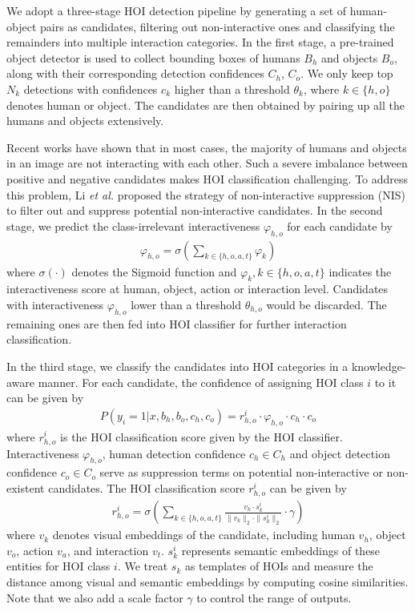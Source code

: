 \documentclass[sigconf,screen]{acmart}
\begin{document}
We adopt a three-stage HOI detection pipeline by generating a set of human-object pairs as candidates, filtering out non-interactive ones and classifying the remainders into multiple interaction categories. In the first stage, a pre-trained object detector is used to collect bounding boxes of humans $B_h$ and objects $B_o$, along with their corresponding detection confidences $C_h$, $C_o$. We only keep top $N_k$ detections with confidences $c_k$ higher than a threshold $\theta_k$, where $k \in \{h, o\}$ denotes human or object. The candidates are then obtained by pairing up all the humans and objects extensively.

Recent works have shown that in most cases, the majority of humans and objects in an image are not interacting with each other. Such a severe imbalance between positive and negative candidates makes HOI classification challenging. To address this problem, Li \textit{et al.} \cite{li2019transferable} proposed the strategy of non-interactive suppression (NIS) to filter out and suppress potential non-interactive candidates. In the second stage, we predict the class-irrelevant interactiveness $\varphi_{h,o}$ for each candidate by
\begin{gather}
\varphi_{h,o} = \sigma(\sum_{k \in \{h, o, a, t\}} \varphi_k)
\end{gather}
where $\sigma(\cdot)$ denotes the Sigmoid function and $\varphi_k, k \in \{h, o, a, t\}$ indicates the interactiveness score at human, object, action or interaction level. Candidates with interactiveness $\varphi_{h,o}$ lower than a threshold $\theta_{h,o}$ would be discarded. The remaining ones are then fed into HOI classifier for further interaction classification.

In the third stage, we classify the candidates into HOI categories in a knowledge-aware manner. For each candidate, the confidence of assigning HOI class $i$ to it can be given by
\begin{gather}
P(y_i = 1 | x, b_h, b_o, c_h, c_o) = r^i_{h, o} \cdot \varphi_{h, o} \cdot c_h \cdot c_o
\end{gather}
where $r^i_{h, o}$ is the HOI classification score given by the HOI classifier. Interactiveness $\varphi_{h, o}$, human detection confidence $c_h \in C_h$ and object detection confidence $c_o \in C_o$ serve as suppression terms on potential non-interactive or non-existent candidates. The HOI classification score $r^i_{h, o}$ can be given by
\begin{gather}
r^i_{h, o} = \sigma(\sum_{k \in \{h, o, a, t\}} \frac{v_k \cdot s^i_k}{\|v_k\|_2 \cdot \|s^i_k\|_2} \cdot \gamma)
\end{gather}
where $v_k$ denotes visual embeddings of the candidate, including human $v_h$, object $v_o$, action $v_a$, and interaction $v_t$. $s_k^i$ represents semantic embeddings of these entities for HOI class $i$. We treat $s_k$ as templates of HOIs and measure the distance among visual and semantic embeddings by computing cosine similarities. Note that we also add a scale factor $\gamma$ to control the range of outputs.
\end{document}
